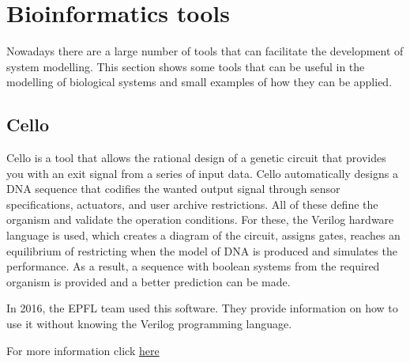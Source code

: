 \documentclass[11pt, letterpaper, english]{article}
\begin{document}
\newpage

\section{Bioinformatics tools}
\par{Nowadays there are a large number of tools that can facilitate the development of system modelling. This section shows some tools that can be useful in the modelling of biological systems and small examples of how they can be applied.}

    \subsection{Cello}
    \par{Cello is a tool that allows the rational design of a genetic circuit that provides you with an exit signal from a series of input data. Cello automatically designs a DNA sequence that codifies the wanted output signal through sensor specifications, actuators, and user archive restrictions. All of these define the organism and validate the operation conditions. For these, the Verilog hardware language is used, which creates a diagram of the circuit, assigns gates, reaches an equilibrium of restricting when the model of DNA is produced and simulates the performance.
    As a result, a sequence with boolean systems from the required organism is provided and a better prediction can be made.}
    \par{In 2016, the EPFL team used this software. They provide information on how to use it without knowing the Verilog programming language.}
    \par{For more information click  \href{https://2016.igem.org/Team:EPFL/Software_CELLO}{here}}
    
\end{document}
